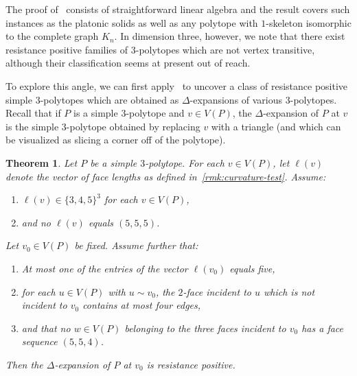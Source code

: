 \documentclass[11pt,a4paper]{amsart}
\newtheorem{theorem}{Theorem}[section]
\begin{document}
The proof of~ consists of straightforward linear algebra and the result covers such instances as the platonic solids as well as any polytope with $1$-skeleton isomorphic to the complete graph $K_n$. In dimension three, however, we note that there exist resistance positive families of $3$-polytopes which are not vertex transitive, although their classification seems at present out of reach.

To explore this angle, we can first apply~ to uncover a class of resistance positive simple $3$-polytopes which are obtained as $\Delta$-expansions of various $3$-polytopes. Recall that if $P$ is a simple $3$-polytope and $v\in V(P)$, the $\Delta$-expansion of $P$ at $v$ is the simple $3$-polytope obtained by replacing $v$ with a triangle (and which can be visualized as slicing a corner off of the polytope).

\begin{theorem}\label{thm:delta-expansions}
    Let $P$ be a simple $3$-polytope. For each $v\in V(P)$, let $\boldsymbol\ell(v)$ denote the vector of face lengths as defined in~\cref{rmk:curvature-test}. Assume:
        \begin{enumerate}[label=(\roman*)]
            \item $\boldsymbol{\ell}(v)\in \{3, 4, 5\}^3$ for each $v\in V(P)$,
            \item and no $\boldsymbol{\ell}(v)$ equals $(5, 5, 5)$.
        \end{enumerate}
    Let $v_0\in V(P)$ be fixed. Assume further that:
        \begin{enumerate}
            \item[(iii)] At most one of the entries of the vector $\boldsymbol{\ell}(v_0)$ equals five,
            \item[(iv)] for each $u\in V(P)$ with $u\sim v_0$, the $2$-face incident to $u$ which is not incident to $v_0$ contains at most four edges,
            \item[(v)] and that no $w\in V(P)$ belonging to the three faces incident to $v_0$ has a face sequence $(5, 5, 4)$.
        \end{enumerate}
    Then the $\Delta$-expansion of $P$ at $v_0$ is resistance positive.  
\end{theorem}
\end{document}
